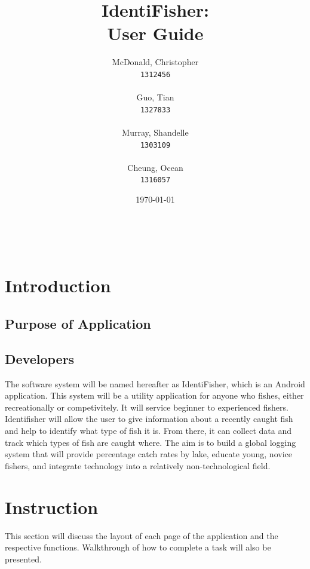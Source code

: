 \documentclass{article}
\title{IdentiFisher: \\ User Guide \\}
\author{
\Large McDonald, Christopher\\
\texttt{1312456} \\ \\
\Large Guo, Tian\\
\texttt{1327833} \\ \\
\Large Murray, Shandelle\\
\texttt{1303109} \\ \\
\Large Cheung, Ocean\\
\texttt{1316057} \\
}
\date{\today}
\begin{document}
\maketitle

\newpage
\tableofcontents
\vfill
\noindent \\


\pagebreak
\section{Introduction}

\subsection{Purpose of Application}


\subsection{Developers}
The software system will be named hereafter as IdentiFisher, which is an Android application.
This system will be a utility application for anyone who fishes, either recreationally or
competivitely. It will service beginner to experienced fishers. Identifisher will allow
the user to give information about a recently caught fish and help to identify what type
of fish it is. From there, it can collect data and track which types of fish are caught where. The aim is to
build a global logging system that will provide percentage catch rates by lake,
educate young, novice fishers, and integrate technology into a relatively non-technological field.


\section{Instruction}
This section will discuss the layout of each page of the application and the respective functions.
Walkthrough of how to complete a task will also be presented.
\end{document}
